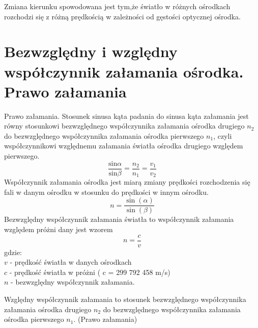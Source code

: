 \documentclass[a4paper,12pt]{scrbook} %
\begin{document}
Zmiana kierunku spowodowana jest tym,że światło w różnych ośrodkach rozchodzi się z różną prędkością w zależności od gęstości optycznej ośrodka.

\section{Bezwzględny i względny współczynnik załamania ośrodka. Prawo załamania}
Prawo załamania. Stosunek sinusa kąta padania do sinusa kąta załamania jest równy stosunkowi bezwzględnego współczynnika załamania ośrodka drugiego $n_{2}$ do bezwzględnego współczynnika załamania ośrodka pierwszego $n_{1}$, czyli współczynnikowi względnemu załamania światła ośrodka drugiego względem pierwszego.
\begin{equation}{\frac{\text{sin}\alpha }{\text{sin}\beta}=\frac{n_{{2}}}{n_{{1}}}=\frac{v_{{1}}}{v_{{2}}}}\end{equation}
Współczynnik załamania ośrodka jest miarą zmiany prędkości rozchodzenia się fali w danym ośrodku w stosunku do prędkości w innym ośrodku.
\begin{equation}
n = \frac{\sin(\alpha)}{\sin(\beta)}
\end{equation}
Bezwzględny współczynnik załamania światła to współczynnik załamania względem próżni dany jest wzorem 
\begin{equation}
{n = \frac{c}{v}}
\end{equation}
gdzie:\\ $v$ - prędkość światła w danych ośrodkach
\\
$c$ - prędkość światła w próżni ( c = 299 792 458 m/s)
\\
$n$ - bezwzględny współczynnik załamania.

Względny współczynnik załamania to stosunek bezwzględnego współczynnika załamania ośrodka drugiego $n_{2}$ do bezwzględnego współczynnika załamania ośrodka pierwszego $n_{1}$. (Prawo załamania)
\end{document}
